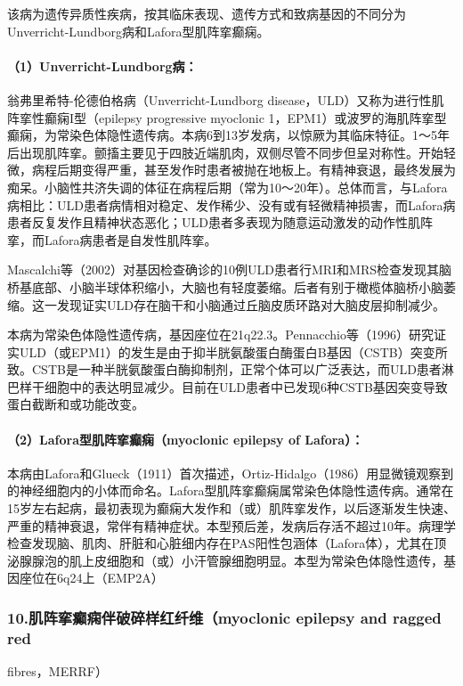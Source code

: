 该病为遗传异质性疾病，按其临床表现、遗传方式和致病基因的不同分为Unverricht-Lundborg病和Lafora型肌阵挛癫痫。

\paragraph{（1）Unverricht-Lundborg病：}

翁弗里希特-伦德伯格病（Unverricht-Lundborg
disease，ULD）又称为进行性肌阵挛性癫痫I型（epilepsy progressive
myoclonic
1，EPM1）或波罗的海肌阵挛型癫痫，为常染色体隐性遗传病。本病6到13岁发病，以惊厥为其临床特征。1～5年后出现肌阵挛。颤搐主要见于四肢近端肌肉，双侧尽管不同步但呈对称性。开始轻微，病程后期变得严重，甚至发作时患者被抛在地板上。有精神衰退，最终发展为痴呆。小脑性共济失调的体征在病程后期（常为10～20年）。总体而言，与Lafora病相比：ULD患者病情相对稳定、发作稀少、没有或有轻微精神损害，而Lafora病患者反复发作且精神状态恶化；ULD患者多表现为随意运动激发的动作性肌阵挛，而Lafora病患者是自发性肌阵挛。

Mascalchi等（2002）对基因检查确诊的10例ULD患者行MRI和MRS检查发现其脑桥基底部、小脑半球体积缩小，大脑也有轻度萎缩。后者有别于橄榄体脑桥小脑萎缩。这一发现证实ULD存在脑干和小脑通过丘脑皮质环路对大脑皮层抑制减少。

本病为常染色体隐性遗传病，基因座位在21q22.3。Pennacchio等（1996）研究证实ULD（或EPM1）的发生是由于抑半胱氨酸蛋白酶蛋白B基因（CSTB）突变所致。CSTB是一种半胱氨酸蛋白酶抑制剂，正常个体可以广泛表达，而ULD患者淋巴样干细胞中的表达明显减少。目前在ULD患者中已发现6种CSTB基因突变导致蛋白截断和或功能改变。

\paragraph{（2）Lafora型肌阵挛癫痫（myoclonic epilepsy of Lafora）：}

本病由Lafora和Glueck（1911）首次描述，Ortiz-Hidalgo（1986）用显微镜观察到的神经细胞内的小体而命名。Lafora型肌阵挛癫痫属常染色体隐性遗传病。通常在15岁左右起病，最初表现为癫痫大发作和（或）肌阵挛发作，以后逐渐发生快速、严重的精神衰退，常伴有精神症状。本型预后差，发病后存活不超过10年。病理学检查发现脑、肌肉、肝脏和心脏细内存在PAS阳性包涵体（Lafora体），尤其在顶泌腺腺泡的肌上皮细胞和（或）小汗管腺细胞明显。本型为常染色体隐性遗传，基因座位在6q24上（EMP2A）

\subsubsection{10.肌阵挛癫痫伴破碎样红纤维（myoclonic epilepsy and ragged red}
fibres，MERRF）

